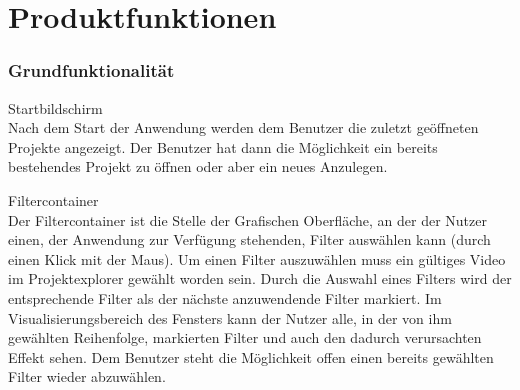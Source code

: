 \chapter {Produktfunktionen}

\subsection{Grundfunktionalität}
\setcounter{counterKriterien}{0}
 Startbildschirm \\
Nach dem Start der Anwendung werden dem Benutzer die zuletzt geöffneten Projekte angezeigt. Der Benutzer
hat dann die Möglichkeit ein bereits bestehendes Projekt zu öffnen oder aber ein neues Anzulegen.
 
 Filtercontainer \\
Der Filtercontainer ist die Stelle der Grafischen Oberfläche, an der der Nutzer einen, der Anwendung
zur Verfügung stehenden, Filter auswählen kann (durch einen Klick mit der Maus). Um einen Filter auszuwählen
muss ein gültiges Video im Projektexplorer gewählt worden sein. Durch die Auswahl eines Filters wird
der entsprechende Filter als der nächste anzuwendende Filter markiert. Im Visualisierungsbereich des
Fensters kann der Nutzer alle, in der von ihm gewählten Reihenfolge, markierten Filter und auch den
dadurch verursachten Effekt sehen. Dem Benutzer steht die Möglichkeit offen einen bereits gewählten
Filter wieder abzuwählen.

